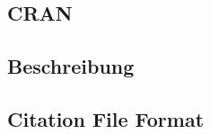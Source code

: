 \subsection{CRAN} %
\label{subsec:datenbeschaffung_cran}

\subsection{Beschreibung} %
\label{subsec:datenbeschaffung_beschreibung}

\subsection{Citation File Format} %
\label{subsec:datenbeschaffung_cff}

\subsection{} %
\label{subsec:datenbeschaffung_bibtex}
